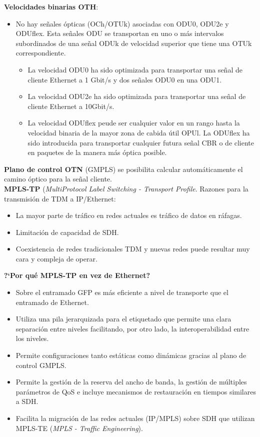 \documentclass[10pt,portrait, twocolumn]{article}
\begin{document}
\textbf{Velocidades binarias OTH}:
	\begin{itemize}
	\item No hay señales ópticas (OCh/OTUk) asociadas con ODU0, ODU2e y ODUflex. Esta señales ODU se transportan en uno o más intervalos subordinados de una señal ODUk de velocidad superior que tiene una OTUk correspondiente.
		\begin{itemize}
		\item La velocidad ODU0 ha sido optimizada para transportar una señal de cliente Ethernet a 1 Gbit/s y dos señales ODU0 en una ODU1.
		\item La velocidad ODU2e ha sido optimizada para transportar una señal de cliente Ethernet a 10Gbit/s.
		\item La velocidad ODUflex peude ser cualquier valor en un rango hasta la velocidad binaria de la mayor zona de cabida útil OPUl. La ODUflex ha sido introducida para transportar cualquier futura señal CBR o de cliente en paquetes de la manera más óptica posible.
		\end{itemize}
	\end{itemize}
	
\textbf{Plano de control OTN} (GMPLS) se posibilita calcular automáticamente el camino óptico para la señal cliente.\\

\textbf{MPLS-TP} (\textit{MultiProtocol Label Switching - Transport Profile}. Razones para la transmisión de TDM a IP/Ethernet:

	\begin{itemize}
	\item La mayor parte de tráfico en redes actuales es tráfico de datos en ráfagas.
	\item Limitación de capacidad de SDH.
	\item Coexistencia de redes tradicionales TDM y nuevas redes puede resultar muy cara y compleja de operar.
	\end{itemize}

\textbf{?`Por qué MPLS-TP en vez de Ethernet?} 
	\begin{itemize}
	\item Sobre el entramado GFP es más eficiente a nivel de transporte que el entramado de Ethernet.
	\item Utiliza una pila jerarquizada para el etiquetado que permite una clara separación entre niveles facilitando, por otro lado, la interoperabilidad entre los niveles.
	\item Permite configuraciones tanto estáticas como dinámicas gracias al plano de control GMPLS.
	\item Permite la gestión de la reserva del ancho de banda, la gestión de múltiples parámetros de QoS e incluye mecanismos de restauración en tiempos similares a SDH.
	\item Facilita la migración de las redes actuales (IP/MPLS) sobre SDH que utilizan MPLS-TE (\textit{MPLS - Traffic Engineering}).
	\end{itemize}
	
\end{document}
